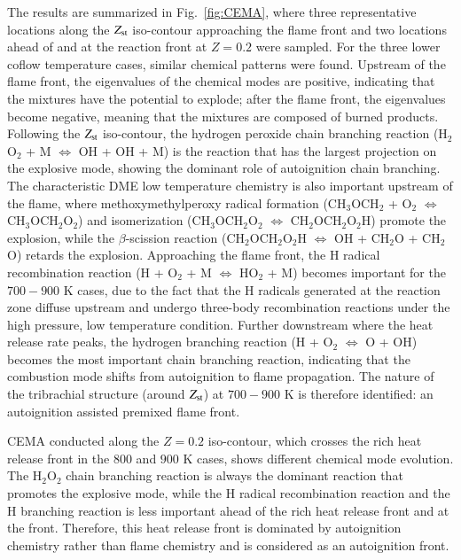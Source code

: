 \documentclass[review,3p,times]{elsarticle}
\begin{document}
The results are summarized in Fig.~\ref{fig:CEMA}, where three representative locations along the $Z_{\rm st}$ iso-contour approaching the flame front and two locations ahead of and at the reaction front at $Z = 0.2$ were sampled.  For the three lower coflow temperature cases, similar chemical patterns were found.  Upstream of the flame front, the eigenvalues of the chemical modes are positive, indicating that the mixtures have the potential to explode; after the flame front, the eigenvalues become negative, meaning that the mixtures are composed of burned products.  Following the $Z_{\rm st}$ iso-contour, the hydrogen peroxide chain branching reaction (H$_2$O$_2$ + M $\Longleftrightarrow$ OH + OH + M) is the reaction that has the largest projection on the explosive mode, showing the dominant role of autoignition chain branching.  The characteristic DME low temperature chemistry is also important upstream of the flame, where methoxymethylperoxy radical formation (CH$_3$OCH$_2$ + O$_2$ $\Longleftrightarrow$ CH$_3$OCH$_2$O$_2$) and isomerization (CH$_3$OCH$_2$O$_2$ $\Longleftrightarrow$ CH$_2$OCH$_2$O$_2$H) promote the explosion, while the $\beta$-scission reaction (CH$_2$OCH$_2$O$_2$H $\Longleftrightarrow$ OH + CH$_2$O + CH$_2$O) retards the explosion.  Approaching the flame front, the H radical recombination reaction (H + O$_2$ + M $\Longleftrightarrow$ HO$_2$ + M) becomes important for the $700-900$ K cases, due to the fact that the H radicals generated at the reaction zone diffuse upstream and undergo three-body recombination reactions under the high pressure, low temperature condition.  Further downstream where the heat release rate peaks, the hydrogen branching reaction (H + O$_2$ $\Longleftrightarrow$ O + OH) becomes the most important chain branching reaction, indicating that the combustion mode shifts from autoignition to flame propagation.  The nature of the tribrachial structure (around $Z_{\rm st}$) at $700-900$ K is therefore identified: an autoignition assisted premixed flame front.

CEMA conducted along the $Z = 0.2$ iso-contour, which crosses the rich heat release front in the $800$ and $900$ K cases, shows different chemical mode evolution.  The H$_2$O$_2$ chain branching reaction is always the dominant reaction that promotes the explosive mode, while the H radical recombination reaction and the H branching reaction is less important ahead of the rich heat release front and at the front.  Therefore, this heat release front is dominated by autoignition chemistry rather than flame chemistry and is considered as an autoignition front. 
\end{document}
